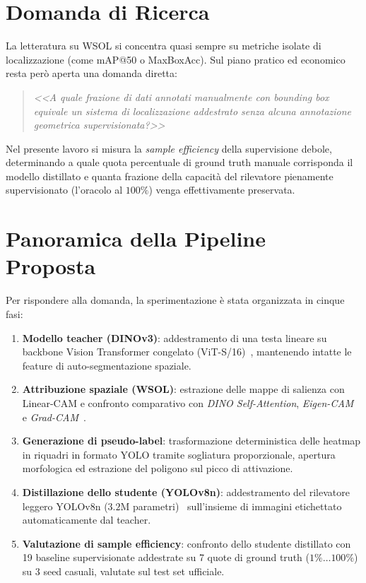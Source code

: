 \section{Domanda di Ricerca}
\label{sec:intro_domanda}
La letteratura su WSOL si concentra quasi sempre su metriche isolate di localizzazione (come mAP@50 o MaxBoxAcc). Sul piano pratico ed economico resta però aperta una domanda diretta:
\begin{quote}
    \centering
    \textit{<<A quale frazione di dati annotati manualmente con bounding box equivale un sistema di localizzazione addestrato senza alcuna annotazione geometrica supervisionata?>>}
\end{quote}
Nel presente lavoro si misura la \textit{sample efficiency} della supervisione debole, determinando a quale quota percentuale di ground truth manuale corrisponda il modello distillato e quanta frazione della capacità del rilevatore pienamente supervisionato (l'oracolo al $100\%$) venga effettivamente preservata.

\section{Panoramica della Pipeline Proposta}
\label{sec:intro_pipeline}
Per rispondere alla domanda, la sperimentazione è stata organizzata in cinque fasi:
\begin{enumerate}
    \item \textbf{Modello teacher (DINOv3)}: addestramento di una testa lineare su backbone Vision Transformer congelato (ViT-S/16)~\cite{caron2021emerging,oquab2023dinov2,simeoni2025dinov3}, mantenendo intatte le feature di auto-segmentazione spaziale.
    \item \textbf{Attribuzione spaziale (WSOL)}: estrazione delle mappe di salienza con Linear-CAM e confronto comparativo con \textit{DINO Self-Attention}, \textit{Eigen-CAM}~\cite{muhammad2020eigen} e \textit{Grad-CAM}~\cite{selvaraju2017grad}.
    \item \textbf{Generazione di pseudo-label}: trasformazione deterministica delle heatmap in riquadri in formato YOLO tramite sogliatura proporzionale, apertura morfologica ed estrazione del poligono sul picco di attivazione.
    \item \textbf{Distillazione dello studente (YOLOv8n)}: addestramento del rilevatore leggero YOLOv8n ($3.2\text{M}$ parametri)~\cite{jocher2023ultralytics} sull'insieme di immagini etichettato automaticamente dal teacher.
    \item \textbf{Valutazione di sample efficiency}: confronto dello studente distillato con 19 baseline supervisionate addestrate su 7 quote di ground truth ($1\% \dots 100\%$) su 3 seed casuali, valutate sul test set ufficiale.
\end{enumerate}

